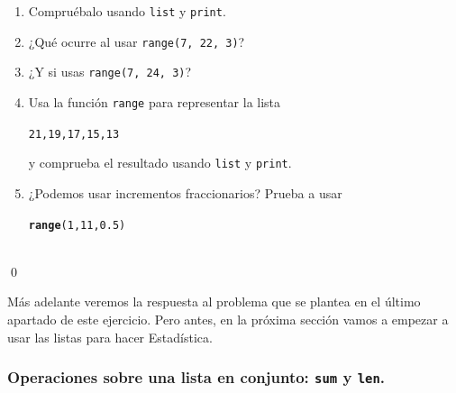 \documentclass[10pt,a4paper]{article}\usepackage[]{graphicx}\usepackage[]{color}
\makeatletter
\newcommand{\hlnum}[1]{\textcolor[rgb]{0.686,0.059,0.569}{#1}}%
\newcommand{\hlstd}[1]{\textcolor[rgb]{0.345,0.345,0.345}{#1}}%
\newcommand{\hlkwd}[1]{\textcolor[rgb]{0.737,0.353,0.396}{\textbf{#1}}}%
\newenvironment{kframe}{%
 \def\at@end@of@kframe{}%
 \ifinner\ifhmode%
  \def\at@end@of@kframe{\end{minipage}}%
  \begin{minipage}{\columnwidth}%
 \fi\fi%
 \def\FrameCommand##1{\hskip\@totalleftmargin \hskip-\fboxsep
 \colorbox{shadecolor}{##1}\hskip-\fboxsep
     \hskip-\linewidth \hskip-\@totalleftmargin \hskip\columnwidth}%
 \MakeFramed {\advance\hsize-\width
   \@totalleftmargin\z@ \linewidth\hsize
   \@setminipage}}%
 {\par\unskip\endMakeFramed%
 \at@end@of@kframe}
\newenvironment{knitrout}{}{} %
\makeatother
\begin{document}
\begin{ejercicio}
\label{tut02:ejercicio14}
\quad
\begin{enumerate}
\item Compruébalo usando {\tt list} y {\tt print}.
\item ¿Qué ocurre al usar {\tt range(7, 22, 3)}?
\item ¿Y si usas {\tt range(7, 24, 3)}?
\item Usa la función {\tt range} para representar la lista
\begin{knitrout}
\color{fgcolor}\begin{kframe}
\begin{alltt}
21, 19, 17, 15, 13
\end{alltt}
\end{kframe}
\end{knitrout}
y comprueba el resultado usando {\tt list} y {\tt print}.
\item ¿Podemos usar incrementos fraccionarios? Prueba a usar
\begin{knitrout}
\color{fgcolor}\begin{kframe}
\begin{alltt}
\hlkwd{range}\hlstd{(}\hlnum{1}\hlstd{,} \hlnum{11}\hlstd{,} \hlnum{0.5}\hlstd{)}
\end{alltt}
\end{kframe}
\end{knitrout}
\end{enumerate}
\quad\\
\qed
\end{ejercicio}
Más adelante veremos la respuesta al problema que se plantea en el último apartado de este ejercicio. Pero antes, en la próxima sección vamos a empezar a usar las listas para hacer Estadística.

\subsubsection*{Operaciones sobre una lista en conjunto: {\tt sum} y {\tt len}.}
\label{tut02:subsubsec:operacionesTodosElementosLista}
\end{document}
